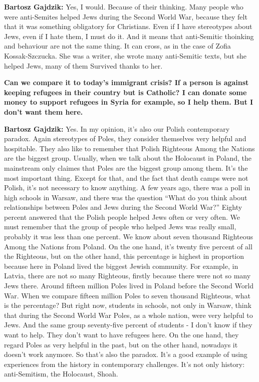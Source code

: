 \textbf{Bartosz Gajdzik:} Yes, I would. Because of their thinking. Many people who were anti-Semites helped Jews during the Second World War, because they felt that it was something obligatory for Christians. Even if I have stereotypes about Jews, even if I hate them, I must do it. And it means that anti-Semitic thoinking and behaviour are not the same thing. It can cross, as in the case of Zofia Kossak-Szczucka. She was a writer, she wrote many anti-Semitic texts, but she helped Jews, many of them Survived thanks to her.  

\textbf{Can we compare it to today’s immigrant crisis? If a person is against keeping refugees in their country but is Catholic?  I can donate some money to support refugees in Syria for example, so I help them. But I don’t want them here.}  

\textbf{Bartosz Gajdzik:} Yes. In my opinion, it’s also our Polish contemporary paradox. Again stereotypes of Poles, they consider themselves very helpful and hospitable. They also like to remember that Polish Righteous Among the Nations are the biggest group. Usually, when we talk about the Holocaust in Poland, the mainstream only claimes that Poles are the biggest group among them. It’s the most important thing. Except for that, and the fact that death camps were not Polish, it’s not necessary to know anything. A few years ago, there was a poll in high schools in Warsaw, and there was the question ``What do you think about relationships between Poles and Jews during the Second World War?'' Eighty percent answered that the Polish people helped Jews often or very often. We must remember that the group of people who helped Jews was really small, probably it was less than one percent. We know about seven thousand Righteous Among the Nations from Poland. On the one hand, it’s twenty five percent of all the Righteous, but on the other hand, this percentage is highest in proportion because here in Poland lived the biggest Jewish community. For example, in Latvia, there are not so many Righteous, firstly because there were not so many Jews there. Around fifteen million Poles lived in Poland before the Second World War. When we compare fifteen million Poles to seven thousand Righteous, what is the percentage? But right now, students in schools, not only in Warsaw, think that during the Second World War Poles, as a whole nation, were very helpful to Jews. And the same group seventy-five percent of students - I don’t know if they want to help. They don’t want to have refugees here. On the one hand, they regard Poles as very helpful in the past, but on the other hand, nowadays it doesn’t work anymore. So that’s also the paradox. It’s a good example of using experiences from the history in contemporary challenges. It’s not only history: anti-Semitism, the Holocaust, Shoah.  


